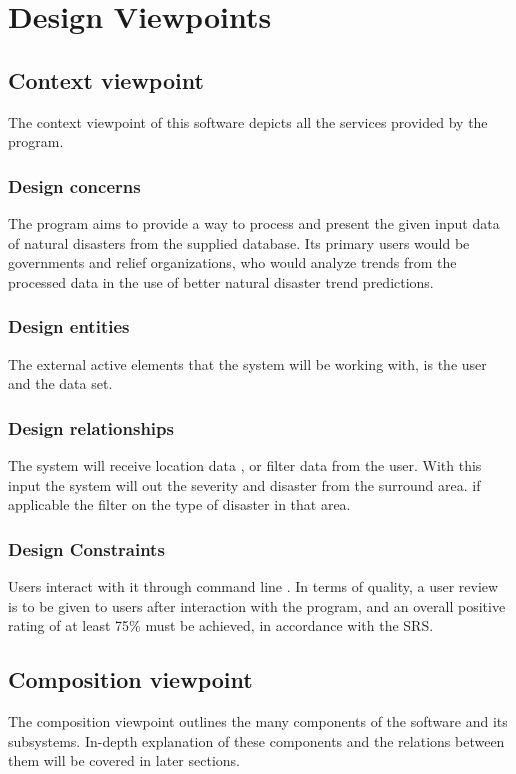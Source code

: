 \documentclass[12pt]{article}
\begin{document}
\section{Design Viewpoints}
        \subsection{Context viewpoint}%
            The context viewpoint of this software depicts all the services provided by the program.
            \subsubsection{Design concerns}
                The program aims to provide a way to process and present the given input data of natural disasters from the supplied database. Its primary users would be governments and relief organizations, who would analyze trends from the processed data in the use of better natural disaster trend predictions.
            \subsubsection{Design entities}
                The external active elements that the system will be working with, is the user and the data set.
            \subsubsection{Design relationships}
                The system will receive location data , or filter data from the user. With this input the system will out the severity and disaster from the surround area. if applicable the filter on the type of disaster in that area.
            \subsubsection{Design  Constraints}
                Users interact with it through command line . In terms of quality, a user review is to be given to users after interaction with the program, and an overall positive rating of at least 75\% must be achieved, in accordance with the SRS.
        \subsection{Composition viewpoint}%
            The composition viewpoint outlines the many components of the software and its subsystems. In-depth explanation of these components and the relations between them will be covered in later sections.
\end{document}
